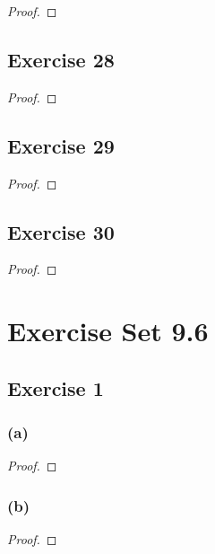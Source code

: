\documentclass[14pt]{extarticle}
\begin{document}
\begin{proof}

\end{proof}

\subsection{Exercise 28}

\begin{proof}

\end{proof}

\subsection{Exercise 29}

\begin{proof}

\end{proof}

\subsection{Exercise 30}

\begin{proof}

\end{proof}

\section{Exercise Set 9.6}

\subsection{Exercise 1}

\subsubsection{(a)}

\begin{proof}

\end{proof}

\subsubsection{(b)}

\begin{proof}

\end{proof}
\end{document}
